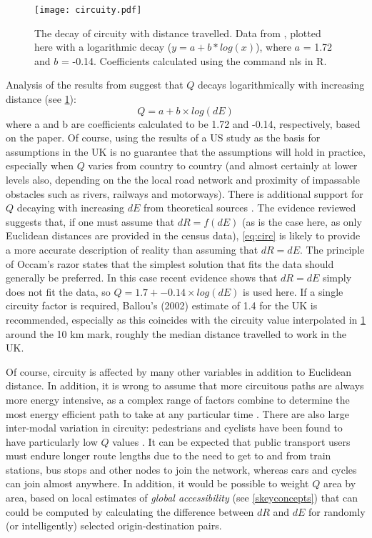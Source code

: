 \begin{figure}[h]
 \centering
 \texttt{[image: circuity.pdf]}
 \caption[The decay of circuity with distance travelled]{The decay of circuity
with distance travelled. Data from
\citep{Levinson2009}, plotted here with a logarithmic decay ($y = a +
b*log(x)$), where $a$ = 1.72 and $b$ = -0.14. Coefficients calculated using the
command nls in R.}
 \label{fig:circuity}
\end{figure}

Analysis of the results from \citet{Levinson2009} suggest that $Q$ decays
logarithmically with increasing distance (see \cref{fig:circuity}):
\begin{equation}
Q = a + b \times log(dE)
\label{eq:circ}
\end{equation}
where a and b are coefficients calculated to be 1.72 and -0.14, respectively,
based on the \citet{Levinson2009} paper. Of course, using the results of
a US study as the basis for assumptions in the UK is no guarantee that the
assumptions will hold in practice, especially when
$Q$ varies from country to country (and almost certainly at lower levels also,
depending on the the local road network and proximity of impassable obstacles
such as rivers, railways and motorways). There is additional support
for $Q$ decaying with increasing $dE$ from 
theoretical sources \citep{Barthelemy2011}.
The evidence reviewed suggests that, if one must
assume that $dR = f(dE)$ (as is the case here, as only Euclidean distances are
provided in the census data), \cref{eq:circ} is likely to
provide a more accurate description of reality than assuming that $dR = dE$.
The principle of Occam's razor states that the simplest solution that
fits the data should generally be preferred. In this case
recent evidence shows that $dR = dE$ simply
does not fit the data, so $Q = 1.7 + -0.14 \times log(dE)$
is used here. If a single circuity factor is required, Ballou's (2002) estimate
of 1.4 for the UK is recommended, especially as this coincides
with the circuity value interpolated in \cref{fig:circuity} around the 10 km
mark, roughly the median distance travelled to work in the UK.

Of course, circuity is affected by many other variables in addition to
Euclidean distance. In addition, it is wrong to assume that
more circuitous paths are always more energy intensive, as a complex
range of factors combine to determine the most energy efficient path
to take at any particular time \citep{Ericsson2006}. There are also large
inter-modal variation in circuity: pedestrians
and cyclists have been found to have particularly low $Q$ values \citep{Iacono2010}.
It can be expected that public transport users must endure longer route lengths
due to the need to get to and from train stations, bus stops and other
nodes to join the network, whereas cars and cycles can join almost anywhere.
In addition, it would be possible to weight $Q$ area by area, based on local
estimates of \emph{global accessibility} (see \cref{skeyconcepts})
that can could be computed by calculating the difference between $dR$ and
$dE$ for randomly (or intelligently) selected origin-destination pairs.


